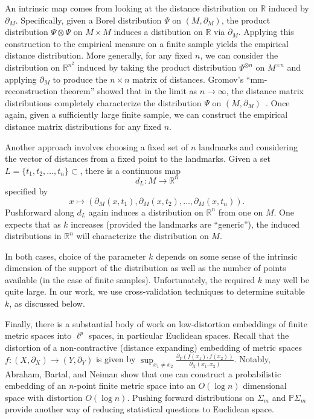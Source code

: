 \documentclass[a4paper,11pt]{article}
\begin{document}
An intrinsic map comes from looking at the distance distribution on $\mathbb{R}$ induced by $\partial_M$.
Specifically, given a Borel distribution $\Psi$ on $(M, \partial_M)$, the product distribution $\Psi \otimes \Psi$ on $M \times M$ induces a distibution on $\mathbb{R}$ via $\partial_M$.
Applying this construction to the empirical measure on a finite sample yields the empirical distance distribution.
More generally, for any fixed $n$, we can consider the distribution on $\mathbb{R}^{n^2}$ induced by taking the product distribution $\Psi^{\otimes n}$ on $M^{\times n}$ and applying $\partial_M$ to produce the $n \times n$ matrix of distances.
Gromov's ``mm-reconstruction theorem'' showed that in the limit as $n \to \infty$, the distance matrix distributions completely characterize the distribution $\Psi$ on $(M, \partial_M)$~\cite{gromov1981}.
Once again, given a sufficiently large finite sample, we can construct the empirical distance matrix distributions for any fixed $n$.

Another approach involves choosing a fixed set of $n$ landmarks and considering the vector of distances from a fixed point to the landmarks.
Given a set $L = \{t_1, t_2, \ldots, t_n\} \subset $, there is a continuous map
\[
d_L \colon M \to \mathbb{R}^n
\]
specified by
\[
x \mapsto (\partial_M(x,t_1), \partial_M(x,t_2), \ldots, \partial_M(x,t_n)).
\]
Pushforward along $d_L$ again induces a distribution on $\mathbb{R}^n$ from one on $M$.
One expects that as $k$ increases (provided the landmarks are ``generic''), the induced distributions in $\mathbb{R}^n$ will characterize the distribution on $M$.

In both cases, choice of the parameter $k$ depends on some sense of the intrinsic dimension of the support of the distribution as well as the number of points available (in the case of finite samples).
Unfortunately, the required $k$ may well be quite large.
In our work, we use cross-validation techniques to determine suitable $k$, as discussed below.

Finally, there is a substantial body of work on low-distortion embeddings of finite metric spaces into $\ell^p$ spaces, in particular Euclidean spaces.
Recall that the distortion of a non-contractive (distance expanding) embedding of metric spaces $f \colon (X, \partial_X) \to (Y, \partial_Y)$ is given by $\sup_{x_1 \neq x_2} \frac{\partial_Y (f(x_1), f(x_2))}{\partial_X (x_1, x_2)}$.
Notably, Abraham, Bartal, and Neiman show that one can construct a probabilistic embedding of an $n$-point finite metric space into an $O(\log n)$ dimensional space with distortion $O(\log n)$.
Pushing forward distributions on $\Sigma_m$ and $\mathbb{P}\Sigma_m$ provide another way of reducing statistical questions to Euclidean space.
\end{document}
